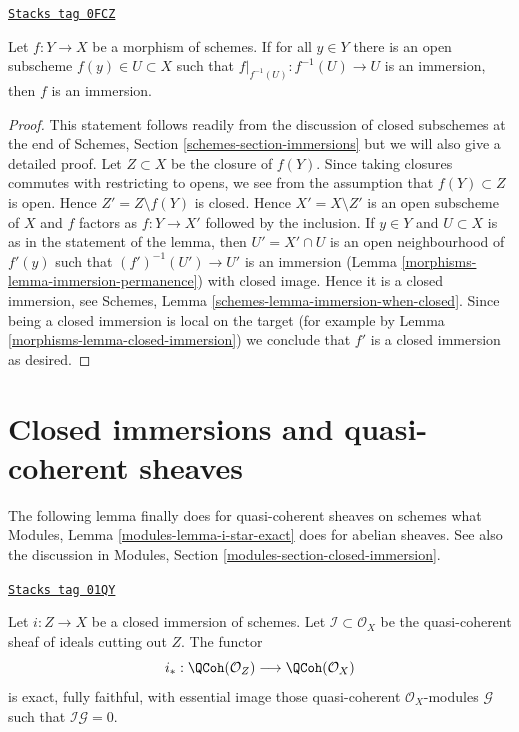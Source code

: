 \begin{lemma}
\label{morphisms-lemma-check-immersion}
\href{https://stacks.math.columbia.edu/tag/0FCZ}{\texttt{Stacks tag 0FCZ}}

Let $f : Y \to X$ be a morphism of schemes. If for all $y \in Y$
there is an open subscheme $f(y) \in U \subset X$ such that
$f|_{f^{-1}(U)} : f^{-1}(U) \to U$ is an immersion, then $f$ is
an immersion.
\end{lemma}

\begin{proof}

This statement follows readily from the discussion of closed subschemes
at the end of Schemes, Section \ref{schemes-section-immersions}
but we will also give a detailed proof.
Let $Z \subset X$ be the closure of $f(Y)$. Since taking closures
commutes with restricting to opens, we see from the assumption that
$f(Y) \subset Z$ is open. Hence $Z' = Z \setminus f(Y)$ is closed.
Hence $X' = X \setminus Z'$ is an open subscheme of $X$ and
$f$ factors as $f : Y \to X'$ followed by the inclusion.
If $y \in Y$ and $U \subset X$ is as in the statement
of the lemma, then $U' = X' \cap U$ is an open neighbourhood
of $f'(y)$ such that $(f')^{-1}(U') \to U'$ is an immersion
(Lemma \ref{morphisms-lemma-immersion-permanence}) with closed image.
Hence it is a closed immersion, see
Schemes, Lemma \ref{schemes-lemma-immersion-when-closed}.
Since being a closed immersion is local on the target
(for example by Lemma \ref{morphisms-lemma-closed-immersion})
we conclude that $f'$ is a closed immersion as desired.
\end{proof}

\section{Closed immersions and quasi-coherent sheaves}
\label{morphisms-section-closed-immersions-quasi-coherent}
The following lemma finally does for quasi-coherent sheaves on schemes
what Modules, Lemma \ref{modules-lemma-i-star-exact} does for abelian sheaves.
See also the discussion in
Modules, Section \ref{modules-section-closed-immersion}.

\begin{lemma}
\label{morphisms-lemma-i-star-equivalence}
\href{https://stacks.math.columbia.edu/tag/01QY}{\texttt{Stacks tag 01QY}}

Let $i : Z \to X$ be a closed immersion of schemes. Let
$\mathcal{I} \subset \mathcal{O}_X$ be the quasi-coherent sheaf of ideals
cutting out $Z$. The functor
$$
i_* :
\QCoh(\mathcal{O}_Z)
\longrightarrow
\QCoh(\mathcal{O}_X)
$$
is exact, fully faithful, with essential image those quasi-coherent
$\mathcal{O}_X$-modules $\mathcal{G}$ such that $\mathcal{I}\mathcal{G} = 0$.
\end{lemma}

